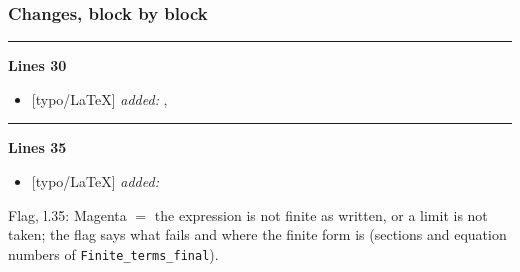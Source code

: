 \documentclass[10pt]{article}
\newenvironment{notebox}{\def\FrameCommand{{\color{notebar}\vrule width 1.5pt}\hspace{6pt}}\MakeFramed{\advance\hsize-\width\FrameRestore}\small}{\endMakeFramed}
\begin{document}
\subsubsection*{Changes, block by block}
\noindent\rule{\linewidth}{0.3pt}\par\noindent\textbf{Lines 30}\par
\begin{itemize}[leftmargin=2.2em,itemsep=1pt,topsep=2pt]
\item[\textbf{l.30}] \textsf{\small [typo/LaTeX]} \emph{added:} $\displaystyle ,$
\end{itemize}
\noindent\rule{\linewidth}{0.3pt}\par\noindent\textbf{Lines 35}\par
\begin{itemize}[leftmargin=2.2em,itemsep=1pt,topsep=2pt]
\item[\textbf{l.35}] \textsf{\small [typo/LaTeX]} \emph{added:} \noindent[\textbf{Checked copy.} Red $=$ corrected or added (part of the expression); red text in square brackets $=$ notes of the check; orange, struck out $=$ removed.]
\end{itemize}
\begin{notebox}\textsf{\small Flag, l.35:} Magenta  $=$ the expression is not finite as written, or a limit is not taken; the flag says what fails and where the finite form is (sections and equation numbers of \texttt{Finite\_terms\_final}).\end{notebox}
\end{document}
